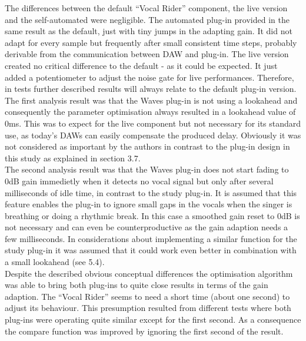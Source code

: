 The differences between the default “Vocal Rider” component, the live version and the self-automated were negligible. The automated plug-in provided in the same result as the default, just with tiny jumps in the adapting gain. It did not adapt for every sample but frequently after small consistent time steps, probably derivable from the communication between DAW and plug-in. The live version created no critical difference to the default - as it could be expected. It just added a potentiometer to adjust the noise gate for live performances. Therefore, in tests further described results will always relate to the default plug-in version.\\
The first analysis result was that the Waves plug-in is not using a lookahead and consequently the parameter optimisation always resulted in a lookahead value of 0ms. This was to expect for the live component but not necessary for its standard use, as today's DAWs can easily compensate the produced delay. Obviously it was not considered as important by the authors in contrast to the plug-in design in this study as explained in section 3.7.\\
The second analysis result was that the Waves plug-in does not start fading to 0dB gain immedietly when it detects no vocal signal but only after several milliseconds of idle time, in contrast to the study plug-in. It is assumed that this feature enables the plug-in to ignore small gaps in the vocals when the singer is breathing or doing a rhythmic break. In this case a smoothed gain reset to 0dB is not necessary and can even be counterproductive as the gain adaption needs a few milliseconds. In considerations about implementing a similar function for the study plug-in it was assumed that it could work even better in combination with a small lookahead (see 5.4).\\
Despite the described obvious conceptual differences the optimisation algorithm was able to bring both plug-ins to quite close results in terms of the gain adaption. The “Vocal Rider” seems to need a short time (about one second) to adjust its behaviour. This presumption resulted from different tests where both plug-ins were operating quite similar except for the first second. As a consequence the compare function was improved by ignoring the first second of the result.\\
